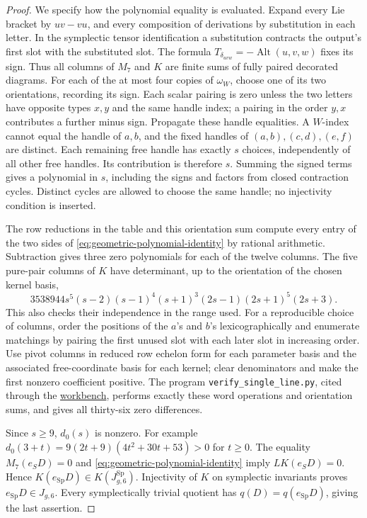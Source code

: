 \begin{proof}
We specify how the polynomial equality is evaluated.
Expand every Lie bracket by $uv-vu$, and every composition
of derivations by substitution in each letter. In the
symplectic tensor identification a substitution contracts
the output's first slot with the substituted slot. The
formula $T_{\delta_{uvw}}=-\operatorname{Alt}(u,v,w)$
fixes its sign. Thus all columns of $M_7$ and $K$ are
finite sums of fully paired decorated diagrams.
For each of the at most four copies of $\omega_W$, choose
one of its two orientations, recording its sign.
Each scalar pairing is zero unless the two letters have
opposite types $x,y$ and the same handle index; a pairing
in the order $y,x$ contributes a further minus sign.
Propagate these handle equalities. A $W$-index cannot
equal the handle of $a,b$, and the fixed handles of
$(a,b),(c,d),(e,f)$ are distinct. Each remaining free
handle has exactly $s$ choices, independently of all
other free handles. Its contribution is therefore $s$.
Summing the signed terms gives a polynomial in $s$,
including the signs and factors from closed contraction
cycles. Distinct cycles are allowed to choose the same
handle; no injectivity condition is inserted.

The row reductions in the table and this orientation
sum compute every entry of the two sides of
\eqref{eq:geometric-polynomial-identity} by rational
arithmetic. Subtraction gives three zero polynomials
for each of the twelve columns. The five pure-pair
columns of $K$ have determinant, up to the orientation
of the chosen kernel basis,
\[
 3538944s^5(s-2)(s-1)^4(s+1)^3
             (2s-1)(2s+1)^5(2s+3).
\]
This also checks their independence in the range used.
For a reproducible choice of columns, order the positions
of the $a$'s and $b$'s lexicographically and enumerate
matchings by pairing the first unused slot with each
later slot in increasing order. Use pivot columns in
reduced row echelon form for each parameter basis and
the associated free-coordinate basis for each kernel;
clear denominators and make the first nonzero coefficient
positive. The program \texttt{verify\_single\_line.py},
cited through the \href{\workbenchurl}{workbench},
performs exactly these word operations and orientation
sums, and gives all thirty-six zero differences.

Since $s\geq9$, $d_0(s)$ is nonzero. For example
$d_0(3+t)=9(2t+9)(4t^2+30t+53)>0$ for $t\geq0$.
The equality $M_7(e_SD)=0$ and
\eqref{eq:geometric-polynomial-identity} imply
$LK(e_SD)=0$. Hence
$K(e_{\operatorname{Sp}}D)\in K(J_{g,6}^{\operatorname{Sp}})$.
Injectivity of $K$ on symplectic invariants proves
$e_{\operatorname{Sp}}D\in J_{g,6}$.
Every symplectically trivial quotient has
$q(D)=q(e_{\operatorname{Sp}}D)$, giving the last assertion.
\end{proof}
